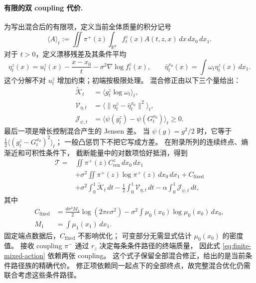 \documentclass[UTF8,a4paper,11pt,fontset=fandol]{ctexart}
\begin{document}
\paragraph{有限的双 coupling 代价.}
为写出混合后的有限项，定义当前全体质量的积分记号
\begin{equation}
\langle A\rangle_t
:=\iint\pi^+(z)\int_{\mathbb R^d}f_t^z(x)A(t,z,x)\,dx\,dx_0\,dx_1.
\label{eq:mass-bracket}
\end{equation}
对于 $t>0$，定义漂移残差及其条件平均
\begin{equation}
\eta_t^z(x)
=u_t^z(x)-\frac{x-x_0}{t}-\sigma^2\nabla\log f_t^z(x),
\qquad
\bar\eta_t^{x_0}(x)=\int\omega_t\eta_t^z(x)\,dx_1.
\label{eq:drift-residual}
\end{equation}
这个分解不对 $u_t^z$ 增加约束；初端按极限处理。
混合修正由以下三个量给出：
\begin{equation}
\begin{aligned}
\widetilde{\mathcal K}_t
&=\langle g_t^z\log\omega_t\rangle_t,\\
\mathcal V_{\eta,t}
&=\langle\|\eta_t^z-\bar\eta_t^{x_0}\|^2\rangle_t,\\
\mathcal J_{\psi,t}
&=\langle\psi(g_t^z)-\psi(G_t^{x_0})\rangle_t\ge0.
\end{aligned}
\label{eq:mixture-corrections}
\end{equation}
最后一项是增长控制混合产生的 Jensen 差。
当 $\psi(g)=g^2/2$ 时，它等于
$\frac12\langle(g_t^z-G_t^{x_0})^2\rangle_t$；
一般凸惩罚下不把它写成方差。
在附录所列的连续终点、熵渐近和可积性条件下，
截断能量中的对数项恰好抵消，得到
\begin{equation}
\boxed{
\begin{aligned}
\mathcal T
={}&\iint\pi^+(z)C_{\mathrm{ren}}^z\,dx_0\,dx_1\\
&+\sigma^2\iint\pi^+(z)\log\pi^+(z)\,dx_0\,dx_1+C_{\mathrm{fixed}}\\
&+\sigma^2\int_0^1\widetilde{\mathcal K}_t\,dt
-\frac12\int_0^1\mathcal V_{\eta,t}\,dt
-\alpha\int_0^1\mathcal J_{\psi,t}\,dt,
\end{aligned}
}
\label{eq:finite-mixed-action}
\end{equation}
其中
\begin{equation}
\begin{aligned}
C_{\mathrm{fixed}}
&=\frac{d\sigma^2M_1}{2}\log(2\pi e\sigma^2)
-\sigma^2\int\mu_0(x_0)\log\mu_0(x_0)\,dx_0,\\
M_1&=\int\mu_1(x_1)\,dx_1.
\end{aligned}
\label{eq:fixed-constant}
\end{equation}
固定端点数据后，$C_{\mathrm{fixed}}$ 不影响优化；
可变部分无需显式估计 $\mu_0(x_0)$ 的密度值。
接收 coupling $\pi^-$ 通过 $r_z$ 决定每条条件路径的终端质量，
因此式 \eqref{eq:finite-mixed-action} 依赖两张 coupling。
这个式子保留全部混合修正，给出的是当前条件路径族的精确代价。
修正项依赖同一起点下的全部终点，故完整混合优化仍需联合考虑这些条件路径。
\end{document}
